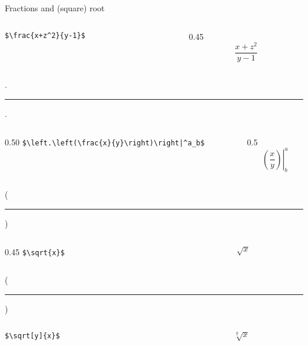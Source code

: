 \begin{frame}[fragile]{Fractions and (square) root}\relax
    \begin{columns}
        \begin{column}{0.45\textwidth}
          \hfill \lstinline[basicstyle=\tt\normalsize]|$\frac{x+z^2}{y-1}$| 
        \end{column}
        \begin{column}{0.45\textwidth}
             $$\frac{x+z^2}{y-1}$$
        \end{column}
    \end{columns}
    \vphantom.
    \hrule
    \vphantom. 
    \begin{columns}
        \begin{column}{0.50\textwidth}
          \hfill \lstinline"$\left.\left(\frac{x}{y}\right)\right|^a_b$" 
        \end{column}
        \begin{column}{0.5\textwidth}
             $$\left.\left(\frac{x}{y}\right)\right|^a_b$$
        \end{column}
    \end{columns}
    \vphantom(
    \hrule
    \vphantom) 
    \begin{columns}
        \begin{column}{0.45\textwidth}
          \hfill \lstinline[basicstyle=\tt\normalsize]|$\sqrt{x}$| 
        \end{column}
        \begin{column}{0.45\textwidth}
             $$\sqrt{x}$$
        \end{column}
    \end{columns}
    \vphantom(
    \hrule
    \vphantom) 
    \begin{columns}
        \begin{column}{0.45\textwidth}
          \hfill \lstinline[basicstyle=\tt\normalsize]|$\sqrt[y]{x}$| 
        \end{column}
        \begin{column}{0.45\textwidth}
             $$\sqrt[y]{x}$$
        \end{column}
    \end{columns}
    
\cprotect{}
\end{frame}

